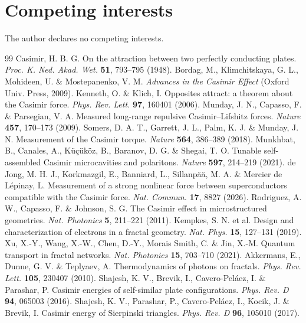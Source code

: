 \documentclass[11pt, a4paper]{article}
\begin{document}
\section*{Competing interests}
The author declares no competing interests.

\begin{thebibliography}{99}
 Casimir, H. B. G. On the attraction between two perfectly conducting plates. \textit{Proc. K. Ned. Akad. Wet.} \textbf{51}, 793--795 (1948).
 Bordag, M., Klimchitskaya, G. L., Mohideen, U. \& Mostepanenko, V. M. \textit{Advances in the Casimir Effect} (Oxford Univ. Press, 2009).
 Kenneth, O. \& Klich, I. Opposites attract: a theorem about the Casimir force. \textit{Phys. Rev. Lett.} \textbf{97}, 160401 (2006).
 Munday, J. N., Capasso, F. \& Parsegian, V. A. Measured long-range repulsive Casimir--Lifshitz forces. \textit{Nature} \textbf{457}, 170--173 (2009).
 Somers, D. A. T., Garrett, J. L., Palm, K. J. \& Munday, J. N. Measurement of the Casimir torque. \textit{Nature} \textbf{564}, 386--389 (2018).
 Munkhbat, B., Canales, A., K\"u\c{c}\"uk\"oz, B., Baranov, D. G. \& Shegai, T. O. Tunable self-assembled Casimir microcavities and polaritons. \textit{Nature} \textbf{597}, 214--219 (2021).
 de Jong, M. H. J., Korkmazgil, E., Banniard, L., Sillanp\"a\"a, M. A. \& Mercier de L\'epinay, L. Measurement of a strong nonlinear force between superconductors compatible with the Casimir force. \textit{Nat. Commun.} \textbf{17}, 8827 (2026).
 Rodriguez, A. W., Capasso, F. \& Johnson, S. G. The Casimir effect in microstructured geometries. \textit{Nat. Photonics} \textbf{5}, 211--221 (2011).
 Kempkes, S. N. et al. Design and characterization of electrons in a fractal geometry. \textit{Nat. Phys.} \textbf{15}, 127--131 (2019).
 Xu, X.-Y., Wang, X.-W., Chen, D.-Y., Morais Smith, C. \& Jin, X.-M. Quantum transport in fractal networks. \textit{Nat. Photonics} \textbf{15}, 703--710 (2021).
 Akkermans, E., Dunne, G. V. \& Teplyaev, A. Thermodynamics of photons on fractals. \textit{Phys. Rev. Lett.} \textbf{105}, 230407 (2010).
 Shajesh, K. V., Brevik, I., Cavero-Pel\'aez, I. \& Parashar, P. Casimir energies of self-similar plate configurations. \textit{Phys. Rev. D} \textbf{94}, 065003 (2016).
 Shajesh, K. V., Parashar, P., Cavero-Pel\'aez, I., Kocik, J. \& Brevik, I. Casimir energy of Sierpinski triangles. \textit{Phys. Rev. D} \textbf{96}, 105010 (2017).

\end{thebibliography}
\end{document}
